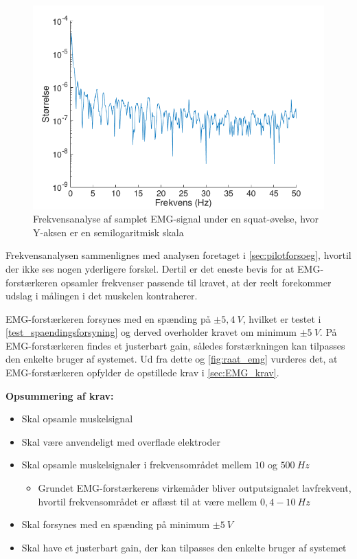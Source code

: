 \begin{figure}[H]
\centering
\includegraphics[width=1\textwidth]{figures/fft_raat_EMG}
\caption{Frekvensanalyse af samplet EMG-signal under en squat-øvelse, hvor Y-aksen er en semilogaritmisk skala}
\label{fig:fft_raat_emg}
\end{figure}

\noindent
Frekvensanalysen sammenlignes med analysen foretaget i \autoref{sec:pilotforsoeg}, hvortil der ikke ses nogen yderligere forskel. Dertil er det eneste bevis for at EMG-forstærkeren opsamler frekvenser passende til kravet, at der reelt forekommer udslag i målingen i det muskelen kontraherer.    
 
EMG-forstærkeren forsynes med en spænding på $\pm 5,4~V$, hvilket er testet i \autoref{test_spaendingsforsyning} og derved overholder kravet om minimum $\pm 5~V$.
På EMG-forstærkeren findes et justerbart gain, således forstærkningen kan tilpasses den enkelte bruger af systemet. Ud fra dette og \autoref{fig:raat_emg} vurderes det, at EMG-forstærkeren opfylder de opstillede krav i \autoref{sec:EMG_krav}.

\vspace{3mm}
\textbf{Opsummering af krav:}
\begin{itemize}
\item[\text{\sffamily \checkmark}] Skal opsamle muskelsignal
\item[\text{\sffamily \checkmark}] Skal være anvendeligt med overflade elektroder
\item[\text{\sffamily $\div$}] Skal opsamle muskelsignaler i frekvensområdet mellem $10$ og $500~Hz$
\begin{itemize}
\item[\text{\sffamily \checkmark}] Grundet EMG-forstærkerens virkemåder bliver outputsignalet lavfrekvent, hvortil frekvensområdet er aflæst til at være mellem $0,4-10~Hz$
\end{itemize}
\item[\text{\sffamily \checkmark}] Skal forsynes med en spænding på minimum $\pm5~V$
\item[\text{\sffamily \checkmark}] Skal have et justerbart gain, der kan tilpasses den enkelte bruger af systemet
\end{itemize}


